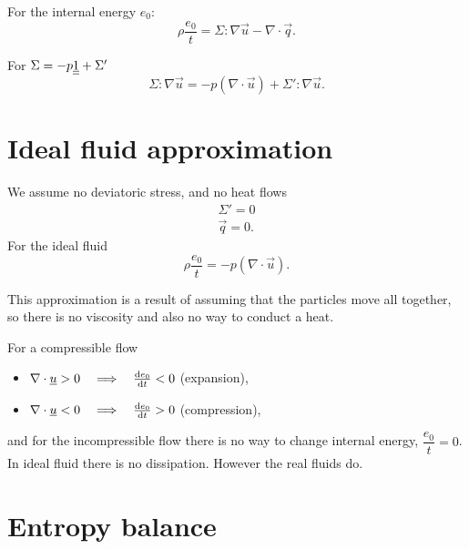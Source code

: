 \documentclass[../main.tex]{subfiles}
\begin{document}
    For the internal energy $e_0$:
    \begin{displaymath}
      \rho \dfrac{e_0}{t} = \Sigma : \nabla \vec u - \nabla \cdot \vec q.
    \end{displaymath}
    
    For $\Sigma = - p \underline{\underline{1}} + \Sigma'$
    \begin{displaymath}
      \Sigma : \nabla \vec u = - p ( \nabla \cdot \vec u) + \Sigma' : \nabla \vec u.
    \end{displaymath}
    
    \section{Ideal fluid approximation}

    We assume no deviatoric stress, and no heat flows
    \begin{align*}
      \Sigma' = 0 \\
      \vec q = 0.
    \end{align*}
    For the ideal fluid
    \begin{displaymath}
      \rho \dfrac{e_0}{t} = - p ( \nabla \cdot \vec u).
    \end{displaymath}

    This approximation is a result of assuming that the particles move all together, 
    so there is no viscosity and also no way to conduct a heat.
    
    For a compressible flow
    \begin{itemize}
      \item $\nabla \cdot \underline{u} > 0 \quad \Longrightarrow \quad \frac{\mathrm{d} e_0}{\mathrm{d} t} < 0 $ (expansion),
      \item $\nabla \cdot \underline{u} < 0 \quad \Longrightarrow \quad \frac{\mathrm{d} e_0}{\mathrm{d} t} > 0 $ (compression),
    \end{itemize}
    and for the incompressible flow there is no way to change internal energy, $\dfrac{e_0}{t} = 0$.
    In ideal fluid there is no dissipation.
    However the real fluids do.

    \section{Entropy balance} 
    \begin{figure}[h]
      \centering
    \end{figure}
    
\end{document}
